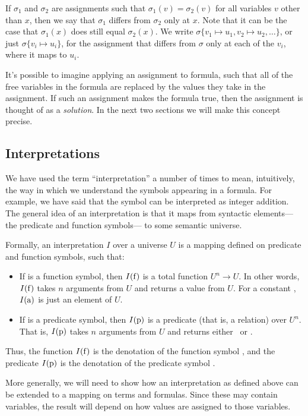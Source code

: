 If $\sigma_1$ and $\sigma_2$ are assignments such that
$\sigma_1(v) = \sigma_2(v)$
for all variables $v$ other than $x$,
then we say that $\sigma_1$ differs from $\sigma_2$ only at $x$.
Note that it can be the case that
$\sigma_1(x)$ does still equal $\sigma_2(x)$.
We write $\sigma \{ v_1 \mapsto u_1, v_2 \mapsto u_2, \ldots \}$,
or just $\sigma \{ v_i \mapsto u_i \}$,
for the assignment that differs from $\sigma$ only at each of the $v_i$,
where it maps to $u_i$.

It's possible to imagine applying an assignment to formula,
such that all of the free variables in the formula
are replaced by the values they take in the assignment.
If such an assignment makes the formula true,
then the assignment is thought of as a
\emph{solution\label{gi:solution}}.
In the next two sections we will make this concept precise.


\subsection{Interpretations}
\label{sec:interpretations}

We have used the term ``interpretation'' a number of times to mean,
intuitively, the way in which we understand
the symbols appearing in a formula.
For example,
we have said that the symbol \co{+} can be interpreted as integer addition.
The general idea of an interpretation is that
it maps from syntactic elements---the predicate and function symbols---%
to some semantic universe.

Formally, an interpretation $I$ over a universe $U$
is a mapping defined on predicate and function symbols, such that:
\begin{itemize}
\item
If  is a function symbol,
then $I(\operatorname{f})$ is a total function $U^n \rightarrow U$.
In other words,
$I(\operatorname{f})$ takes $n$ arguments from $U$
and returns a value from $U$.
For a constant ,
$I(\operatorname{a})$ is just an element of $U$.
\item
If  is a predicate symbol,
then $I(\operatorname{p})$ is a predicate (that is, a relation) over $U^n$.
That is,
$I(\operatorname{p})$ takes $n$ arguments from $U$
and returns either \true\ or \false.
\end{itemize}
Thus,
the function $I(\operatorname{f})$
is the denotation of the function symbol ,
and the predicate $I(\operatorname{p})$
is the denotation of the predicate symbol .

More generally,
we will need to show how an interpretation as defined above
can be extended to a mapping on terms and formulas.
Since these may contain variables,
the result will depend on how values are assigned to those variables.

